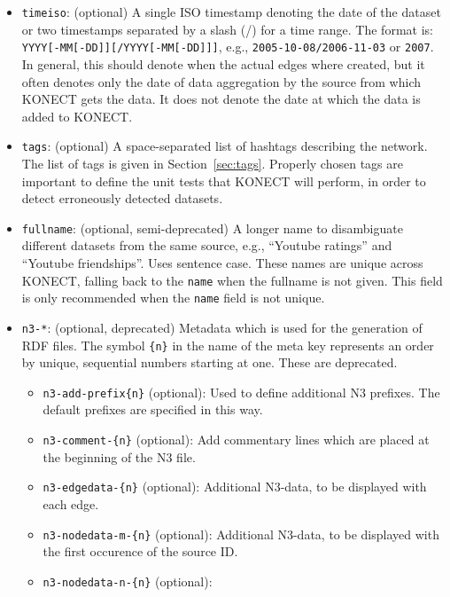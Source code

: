 \documentclass{article}
\begin{document}
\begin{itemize}
  is usually the actual paper about the dataset.  Many researchers have
  a preference about which of their papers should be cited for a dataset
  they have released, and we follow these. 
\item \texttt{timeiso}: (optional) A single ISO timestamp denoting
  the date of the dataset or two timestamps separated by a
  slash (/) for a time range. The format is:
  \texttt{YYYY[-MM[-DD]][/YYYY[-MM[-DD]]]}, e.g., \texttt{2005-10-08/2006-11-03}
  or \texttt{2007}.
  In general, this should denote when the actual edges where created,
  but it often denotes only the date of data aggregation by the source
  from which KONECT gets the data.  It does not denote the date at which
  the data is added to KONECT. 
\item \texttt{tags}: (optional) A space-separated list of hashtags
  describing the network.  The list of tags is given in
  Section~\ref{sec:tags}.  
  Properly chosen tags are important to define the unit tests that
  KONECT will perform, in order to detect erroneously detected
  datasets. 
\item \texttt{fullname}: (optional, semi-deprecated) A longer name to disambiguate
  different datasets from the same source, e.g., ``Youtube
  ratings'' and ``Youtube friendships''.  Uses sentence case.  These
  names are unique across KONECT, falling back to the \texttt{name} when
  the fullname is not given.  This field is only recommended when the
  \texttt{name} field is not unique. 
\item \texttt{n3-*}: (optional, deprecated) Metadata which is used for the
  generation of RDF files. The symbol \texttt{\{n\}} in the name
  of the meta key represents an order by unique, sequential
  numbers starting at one.  These are deprecated. 
  \begin{itemize}
  \item \texttt{n3-add-prefix\{n\}} (optional):
    Used to define additional N3 prefixes. The
    default prefixes are specified in this way.
  \item \texttt{n3-comment-\{n\}} (optional): Add
    commentary lines which are placed at the
    beginning of the N3 file.
  \item \texttt{n3-edgedata-\{n\}} (optional):
    Additional N3-data, to be displayed with each
    edge.
  \item \texttt{n3-nodedata-m-\{n\}} (optional):
    Additional N3-data, to be displayed with the
    first occurence of the source ID.
  \item \texttt{n3-nodedata-n-\{n\}} (optional):

\end{itemize}
\end{itemize}
\end{document}
